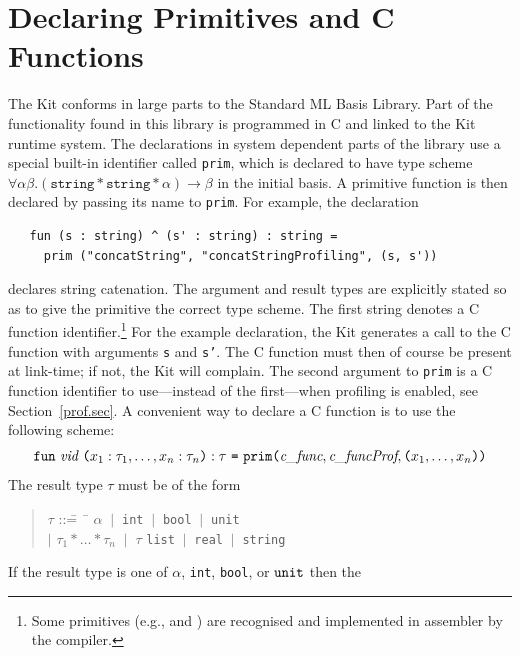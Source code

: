 \documentclass[12pt]{book}
\begin{document}
\section{Declaring Primitives and C Functions}
\label{parPassing.sec}
The Kit conforms in large parts to the Standard ML Basis Library. Part
of the functionality found in this library is programmed in C and
linked to the Kit runtime system.  The declarations in system
dependent parts of the library use a special built-in identifier
called \texttt{prim}, which is declared to have type
scheme $\forall \alpha \beta .  (\texttt{string} \ast \texttt{string}
\ast \alpha) \rightarrow \beta$ in the initial basis.  A primitive
function is then declared by passing its name to \texttt{prim}.  For
example, the declaration
\begin{verbatim}
   fun (s : string) ^ (s' : string) : string = 
     prim ("concatString", "concatStringProfiling", (s, s'))
\end{verbatim}
declares string catenation.  The argument and result types are
explicitly stated so as to give the primitive the correct type scheme.
The first string  denotes a C
function identifier.\footnote{Some primitives (e.g.,  and ) are
  recognised and implemented in assembler by the compiler.} For the
example declaration, the Kit generates a call to the C function  with arguments {\tt s} and {\tt s'}. The C
function must then of course be present at link-time; if not, the Kit will complain. The second
argument to {\tt prim} is a C function identifier to use---instead of the first---when profiling is
enabled, see Section~\ref{prof.sec}. A convenient way to declare a C function is to use the
following scheme:
$$\texttt{fun}~ \emph{vid} ~\texttt{(}x_1:\tau_1, \ldots, x_n:\tau_n\texttt{)}
    : \tau ~\texttt{=} ~\texttt{prim(}\emph{c\_func}, \emph{c\_funcProf}, \texttt{(}
  x_1, \ldots, x_n\texttt{)} \texttt{)}
$$
The result type $\tau$ must be of the form
\begin{quote}
\begin{tabbing}
$\tau$ ::\== ~\= $\alpha$ $~|~$ {\tt int} $~|~$ {\tt bool} $~|~$ {\tt unit} \\ 
  \> $|$ \> $\tau_1 \ast \ldots \ast \tau_n$ $~|~$ $\tau$ {\tt list} $~|~$ {\tt real} $~|~$ {\tt string} 
\end{tabbing}
\end{quote}
\noindent
If the result type is one of $\alpha$, {\tt int}, {\tt bool}, or ${\tt unit}$ then the
\end{document}
